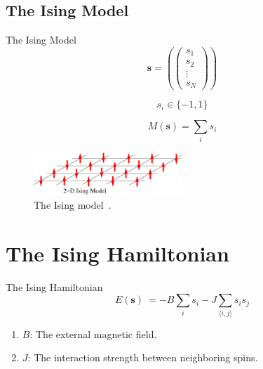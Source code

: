 \documentclass{beamer}
\newcommand{\bolds}[1]{\boldsymbol{#1}}
\newcommand{\bs}{\bolds{s}}
\begin{document}
\subsection{The Ising Model}
\begin{frame}{The Ising Model}
  \begin{equation}%
    \bs = \left(
      \begin{pmatrix}
        s_1\\
        s_2\\
        \vdots\\
        s_N
      \end{pmatrix}
    \right)
  \end{equation}%

  \begin{equation}%
    s_i\in\{-1,1\}
  \end{equation}%

  \begin{equation}%
    M(\bs)=\sum_i s_i
  \end{equation}%

  \begin{figure}[ht]
    \centering
    \includegraphics[width=0.5\textwidth]{figures/ising.png}
    \caption{The Ising model~\cite{ising}.\label{fig:ising} }
  \end{figure}

\end{frame}

\section{The Ising Hamiltonian}
\begin{frame}{The Ising Hamiltonian}
  \begin{equation}
    \boxed{E(\bs)\:= -B \sum_i s_i-J \sum_{\langle i,j\rangle} s_i s_j}
    \label{eq:ising-energy}
  \end{equation}%

  \begin{enumerate}
  \item $B$: The external magnetic field.
  \item $J$: The interaction strength between neighboring spins.
  \end{enumerate}
\end{frame}
\end{document}
